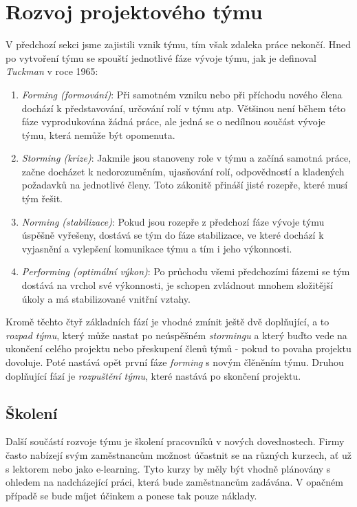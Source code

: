 
\section{Rozvoj projektového týmu}

V předchozí sekci jsme zajistili vznik týmu, tím však zdaleka práce nekončí. Hned po vytvoření týmu se spouští jednotlivé fáze vývoje týmu, jak je definoval \emph{Tuckman} v roce 1965:
\begin{enumerate}
	\item \emph{Forming (formování)}: Při samotném vzniku nebo při příchodu nového člena dochází k představování, určování rolí v týmu atp. Většinou není během této fáze vyprodukována žádná práce, ale jedná se o nedílnou součást vývoje týmu, která nemůže být opomenuta.
	\item \emph{Storming (krize)}: Jakmile jsou stanoveny role v týmu a začíná samotná práce, začne docházet k nedorozuměním, ujasňování rolí, odpovědností a kladených požadavků na jednotlivé členy. Toto zákonitě přináší jisté rozepře, které musí tým řešit.
	\item \emph{Norming (stabilizace)}: Pokud jsou rozepře z předchozí fáze vývoje týmu úspěšně vyřešeny, dostává se tým do fáze stabilizace, ve které dochází k vyjasnění a vylepšení komunikace týmu a tím i jeho výkonnosti.
	\item \emph{Performing (optimální výkon)}: Po průchodu všemi předchozími fázemi se tým dostává na vrchol své výkonnosti, je schopen zvládnout mnohem složitější úkoly a má stabilizované vnitřní vztahy.
\end{enumerate}
Kromě těchto čtyř základních fází je vhodné zmínit ještě dvě doplňující, a to \emph{rozpad týmu}, který může nastat po neúspěšném \emph{stormingu} a který buďto vede na ukončení celého projektu nebo přeskupení členů týmů - pokud to povaha projektu dovoluje. Poté nastává opět první fáze \emph{forming} s novým člěněním týmu. Druhou doplňující fází je \emph{rozpuštění týmu}, které nastává po skončení projektu.

\subsection{Školení}
Další součástí rozvoje týmu je školení pracovníků v nových dovednostech. Firmy často nabízejí svým zaměstnancům možnost účastnit se na různých kurzech, ať už s lektorem nebo jako e-learning. Tyto kurzy by měly být vhodně plánovány s ohledem na nadcházející práci, která bude zaměstnancům zadávána. V opačném případě se bude míjet účinkem a ponese tak pouze náklady.

